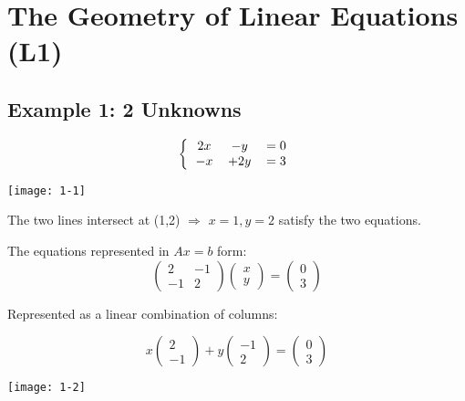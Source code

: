 \documentclass[12pt]{article}
\begin{document}
\section{The Geometry of Linear Equations (L1)}

\subsection{Example 1: 2 Unknowns}

\begin{multicols}{2}
{\[ 
\left \{
  \begin{tabular}{ccc}
  $2x$ & $-y$ &$= 0$ \\
  $-x$ & $+2y$ &$= 3$
  \end{tabular}
\right
.\]}

\texttt{[image: 1-1]}
\end{multicols}

The two lines intersect at (1,2) $\Rightarrow$ $x=1,y=2$ satisfy the two equations.

The equations represented in $Ax=b$ form:
\[
\left(
    \begin{matrix}
        2 & -1\\ 
        -1 & 2 
    \end{matrix}
\right)
\left(
    \begin{matrix}
        x\\ 
        y 
    \end{matrix}
\right)
=
\left(
    \begin{matrix}
        0\\ 
        3 
    \end{matrix}
\right)
\]

Represented as a linear combination of columns:
\begin{multicols}{2}
{\[
x
\left(
    \begin{matrix}
        2\\ 
        -1 
    \end{matrix}
\right)
+y
\left(
    \begin{matrix}
        -1\\ 
        2 
    \end{matrix}
\right)
=
\left(
    \begin{matrix}
        0\\ 
        3 
    \end{matrix}
\right)
\]}

\centering
\texttt{[image: 1-2]}
\end{multicols}
\end{document}
